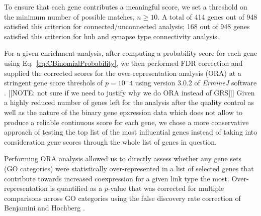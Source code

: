\documentclass[10pt,letterpaper]{article}
\begin{document}
To ensure that each gene contributes a meaningful score, we set a threshold on the minimum number of possible matches, $n \geq 10$.
A total of 414 genes out of 948 satisfied this criterion for connected/unconnected analysis; 168 out of 948 genes satisfied this criterion for hub and synapse type connectivity analysis.

For a given enrichment analysis, after computing a probability score for each gene using Eq.~\eqref{eq:CBinomialProbability}, we then performed FDR correction and supplied the corrected scores for the over-representation analysis (ORA) at a stringent gene score threshols of $p=10^-4$ using version 3.0.2 of \emph{ErmineJ} software \cite{Gillis2010}.
[[NOTE: not sure if we need to justify why we do ORA instead of GRS]]]
Given a highly reduced number of genes left for the analysis after the quality control as well as the nature of the binary gene epxression data which does not allow to produce a reliable continuous score for each gene, we chose a more conservative approach of testing the top list of the most influential genes instead of taking into consideration gene scores through the whole list of genes in question. 

Performing ORA analysis allowed us to directly assess whether any gene sets (GO categories) were statistically over-represented in a list of selected genes that contribute towards increased coexpression for a given link type the most. Over-representation is quantified as a $p$-value that was corrected for multiple comparisons across GO categories using the false discovery rate correction of Benjamini and Hochberg \cite{Benjamini:1995cd}.
\end{document}
